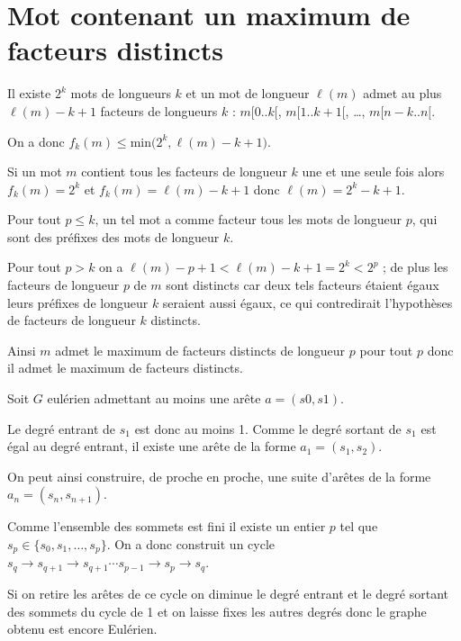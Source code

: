 \section{Mot contenant un maximum de facteurs distincts}
\begin{Exercise}
Il existe $2^k$ mots de longueurs $k$ et un mot de longueur $\ell(m)$ admet au plus $\ell(m) - k + 1$ facteurs de longueurs $k$ : $m[0..k[$, $m[1..k+1[$, \dots, $m[n-k..n[$.

On a donc $f_k(m)\le \text{min}\bigl(2^k, \ell(m) - k + 1\bigr)$.
\end{Exercise} 
\begin{Exercise}
Si un mot $m$ contient tous les facteurs de longueur $k$ une et une seule fois alors $f_k(m) = 2^k$ et $f_k(m) = \ell(m)-k+1$ donc $\ell(m) = 2^k-k+1$.

Pour tout $p\le k$, un tel mot a comme facteur tous les mots de longueur $p$, qui sont des préfixes des mots de longueur $k$.

Pour tout $p> k$ on a $\ell(m) - p +1 < \ell(m) - k + 1 =2^k < 2^p$ ; de plus les facteurs de longueur $p$ de $m$ sont distincts car deux tels facteurs étaient égaux leurs préfixes de longueur $k$ seraient aussi égaux, ce qui contredirait l'hypothèses de facteurs de longueur $k$ distincts.

Ainsi $m$ admet le maximum de facteurs distincts de longueur $p$ pour tout $p$ donc il admet le maximum de facteurs distincts.
\end{Exercise} 
\begin{Exercise}
Soit $G$ eulérien admettant au moins une arête $a=(s0, s1)$.

Le degré entrant de $s_1$ est donc au moins 1. Comme le degré sortant de $s_1$ est égal au degré entrant, il existe une arête de la forme $a_1=(s_1, s_2)$.

On peut ainsi construire, de proche en proche, une suite d'arêtes de la forme $a_n =(s_n, s_{n+1})$.

Comme l'ensemble des sommets est fini il existe un entier $p$ tel que $s_p\in \{s_0, s_1, \ldots, s_p\}$. On a donc construit un cycle $s_q \rightarrow s_{q+1} \rightarrow s_{q+1} \cdots s_{p-1} \rightarrow s_p \rightarrow s_{q}$.

Si on retire les arêtes de ce cycle on diminue le degré entrant et le degré sortant des sommets du cycle de 1 et on laisse fixes les autres degrés donc le graphe obtenu est encore Eulérien.
\end{Exercise} 
